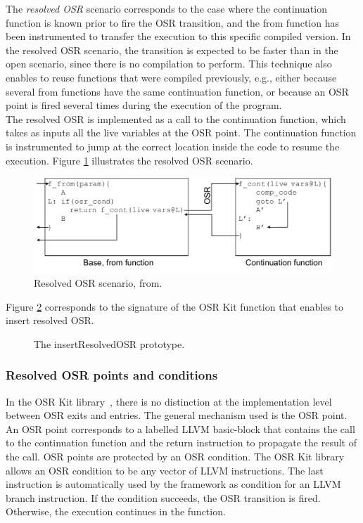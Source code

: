 The \textit{resolved OSR} scenario corresponds to the case where the continuation function is known prior to fire the OSR transition, and the from function has been instrumented to transfer the execution to this specific compiled version.
In the resolved OSR scenario, the transition is expected to be faster than in the open scenario, since there is no compilation to perform. 
This technique also enables to reuse functions that were compiled previously, e.g., either because several from functions have the same continuation function, or because an OSR point is fired several times during the execution of the program.\\

The resolved OSR is implemented as a call to the continuation function, which takes as inputs all the live variables at the OSR point.
The continuation function is instrumented to jump at the correct location inside the code to resume the execution. 
Figure \ref{ResolvedOSRFig} illustrates the resolved OSR scenario.\\

\begin{figure}[h]
\centering
\includegraphics[scale=0.5]{Figures/OSRKitResolvedScenario.pdf}
\decoRule
\caption[Resolved OSR Scenario]{Resolved OSR scenario, from\cite{OSRKit}.}
\label{ResolvedOSRFig}
\end{figure}

Figure \ref{fig:insertresolvedosr} corresponds to the signature of the OSR Kit function that enables to insert resolved OSR.\\

\begin{figure}[h]
\caption{The insertResolvedOSR prototype.}
\label{fig:insertresolvedosr}
\end{figure}

\subsubsection{Resolved OSR points and conditions}
In the OSR Kit library~\cite{OSRKit}, there is no distinction at the implementation level between OSR exits and entries.
The general mechanism used is the OSR point.
An OSR point corresponds to a labelled LLVM basic-block that contains the call to the continuation function and the return instruction to propagate the result of the call.
OSR points are protected by an OSR condition. 
The OSR Kit library allows an OSR condition to be any vector of LLVM instructions. 
The last instruction is automatically used by the framework as condition for an LLVM branch instruction. 
If the condition succeeds, the OSR transition is fired.
Otherwise, the execution continues in the function.\\

